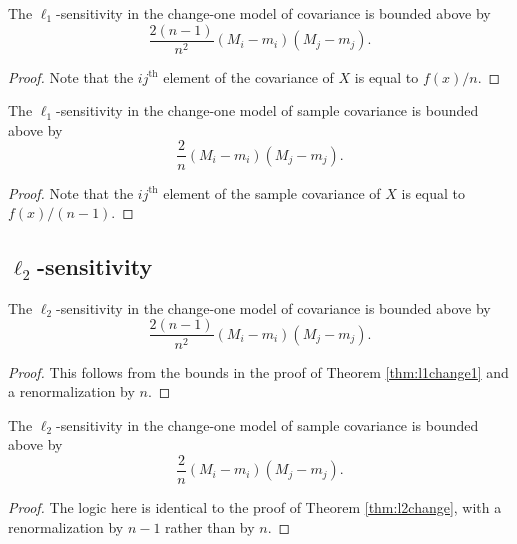 \documentclass[11pt]{scrartcl} %
\begin{document}
\begin{corollary}
The $\ell_1$-sensitivity in the change-one model of covariance is bounded above by
$$\frac{2(n-1)}{n^2}  (M_i - m_i)(M_j - m_j).$$
\end{corollary}

\begin{proof}
Note that the $ij^{\text{th}}$ element of the covariance of $X$ is equal to $f(x)/n$.
\end{proof}

\begin{corollary}
\label{cor:renorm2}
The $\ell_1$-sensitivity in the change-one model of sample covariance is bounded above by
$$\frac{2}{n}  (M_i - m_i)(M_j - m_j).$$
\end{corollary}

\begin{proof}
Note that the $ij^{\text{th}}$ element of the sample covariance of $X$ is equal to $f(x)/(n-1)$.
\end{proof}

\subsection{$\ell_2$-sensitivity}

\begin{theorem}
\label{thm:l2change}
The $\ell_2$-sensitivity in the change-one model of covariance is bounded above by 
$$\frac{2(n-1)}{n^2}  (M_i - m_i)(M_j - m_j).$$
\end{theorem}

\begin{proof}
This follows from the bounds in the proof of Theorem \ref{thm:l1change1} and a renormalization by $n$.
\end{proof}

\begin{corollary}
The $\ell_2$-sensitivity in the change-one model of sample covariance is bounded above by 
$$\frac{2}{n}  (M_i - m_i)(M_j - m_j).$$
\end{corollary}

\begin{proof}
The logic here is identical to the proof of Theorem \ref{thm:l2change}, with a renormalization by $n-1$ rather than by $n$.
\end{proof}



\end{document}
